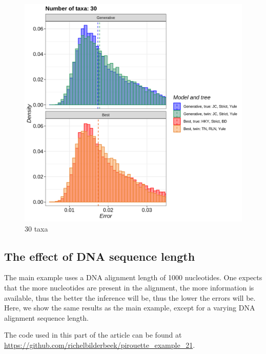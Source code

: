 \begin{figure}[H]
  \includegraphics[width=\textwidth]{pirouette_example_20/errors_30.png}
  \caption{30 taxa}
\end{figure}

\subsection{The effect of DNA sequence length}
\label{subsec:n_nucleotides}

The main example uses a DNA alignment length of 1000 nucleotides.
One expects that the more nucleotides are present in the alignment,
the more information is available,
thus the better the inference will be, 
thus the lower the errors will be.
Here, we show the same results as the main example,
except for a varying DNA alignment sequence length.

The code used in this part of the article can be found at 
\url{https://github.com/richelbilderbeek/pirouette_example_21}.


